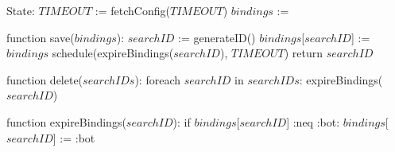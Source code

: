 State:
    $TIMEOUT$ := fetchConfig($TIMEOUT$)
    $bindings$ := {}

function save($bindings$): 
    $searchID$ := generateID()
    $bindings$[$searchID$] := $bindings$
    schedule(expireBindings($searchID$), $TIMEOUT$)
    return $searchID$

function delete($searchIDs$):
    foreach $searchID$ in $searchIDs$:
        expireBindings($searchID$)

function expireBindings($searchID$):
    if $bindings$[$searchID$] :neq :bot:
        $bindings$[$searchID$] := :bot